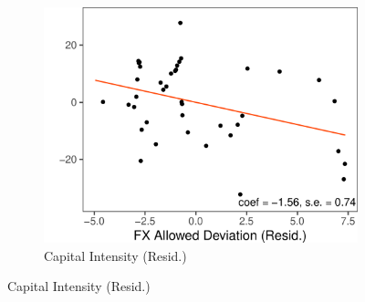 \begin{figure}
\begin{minipage}{\linewidth}
\begin{subfigure}{.33\textwidth}
    \end{subfigure}
    \begin{subfigure}{.33\textwidth}
      \centering
      \caption{Capital Intensity (Resid.)}
      \includegraphics[width=\textwidth]{./Figures/Figure_KY_ERA.pdf}
    \end{subfigure}


\end{minipage}
\end{figure}
